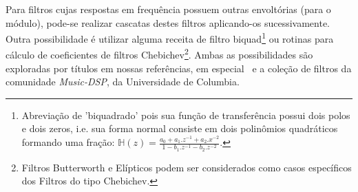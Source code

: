 \begin{itemize}
Para filtros cujas respostas em frequência possuem outras envoltórias (para o módulo),
pode-se realizar cascatas destes filtros aplicando-os sucessivamente.
Outra possibilidade é utilizar alguma receita de filtro
biquad\footnote{Abreviação
de 'biquadrado' pois sua função de transferência possui dois polos e dois zeros, i.e. sua
forma normal consiste em dois polinômios quadráticos formando uma fração:
$\mathbb{H}(z)=\frac{a_0+a_1.z^{-1}+a_2.x^{-2}}{1- b_1.z^{-1} -b_2 . z^{-2}}$.}
ou rotinas para cálculo de coeficientes
de filtros Chebichev\footnote{Filtros Butterworth e Elípticos podem
ser considerados como casos específicos dos Filtros do tipo Chebichev.\cite{Openheim,smith}}.
Ambas as possibilidades são exploradas
por títulos em nossas referências, em especial~\cite{JOSFM,smith} e a coleção de filtros da comunidade \emph{Music-DSP}, da Universidade de Columbia.\cite{music-dsp,Openheim}

\end{itemize}

